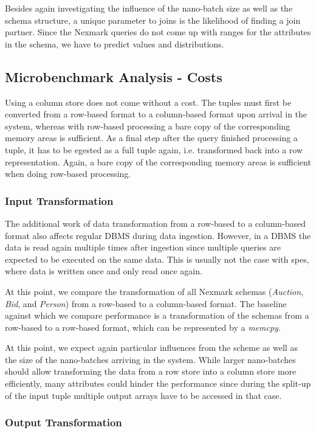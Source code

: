 Besides again investigating the influence of the nano-batch size as well as the schema structure, a unique parameter to joins is the likelihood of finding a join partner.
Since the Nexmark queries do not come up with ranges for the attributes in the schema, we have to predict values and distributions.

\subsection{Microbenchmark Analysis - Costs}

Using a column store does not come without a cost.
The tuples must first be converted from a row-based format to a column-based format upon arrival in the system, whereas with row-based processing a bare copy of the corresponding memory areas is sufficient.
As a final step after the query finished processing a tuple, it has to be egested as a full tuple again, i.e. transformed back into a row representation.
Again, a bare copy of the corresponding memory areas is sufficient when doing row-based processing.

\subsubsection{Input Transformation}
The additional work of data transformation from a row-based to a column-based format also affects regular DBMS during data ingestion.
However, in a DBMS the data is read again multiple times after ingestion since multiple queries are expected to be executed on the same data.
This is usually not the case with \acp{spe}, where data is written once and only read once again.

At this point, we compare the transformation of all Nexmark schemas (\emph{Auction}, \emph{Bid}, and \emph{Person}) from a row-based to a column-based format.
The baseline against which we compare performance is a transformation of the schemas from a row-based to a row-based format, which can be represented by a \emph{memcpy}.


At this point, we expect again particular influences from the scheme as well as the size of the nano-batches arriving in the system.
While larger nano-batches should allow transforming the data from a row store into a column store more efficiently, many attributes could hinder the performance since during the split-up of the input tuple multiple output arrays have to be accessed in that case.

\subsubsection{Output Transformation}

